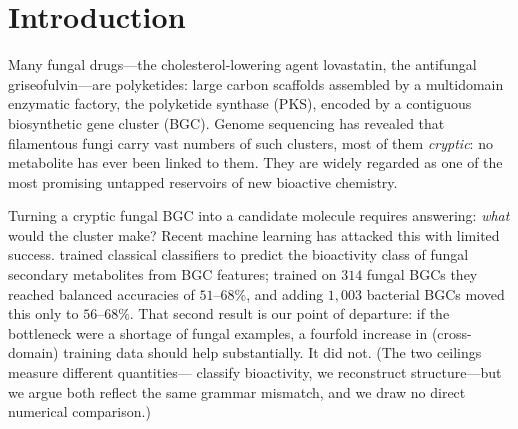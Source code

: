 \documentclass[11pt]{article}
\theoremstyle{definition}
\begin{document}
\begin{abstract}
Prediction and design are one quantity read twice---an \emph{identifiability--controllability
duality} (Theorem~\ref{thm:duality}, \S\ref{sec:duality}): the verifier's consistent set and the
designer's specification space are a single observability $\kappa_O$, so one engine serves both, and
the result travels, with a falsifiable prediction on RiPP biosynthesis. The stance is calibrated:
the iteration-grammar wall is \emph{established} on the prediction side (cross-taxa transfer, a
bacterial control) and \emph{pre-registered} on the design side (the product-neutral degeneracy it
predicts is, as yet, beyond coverage), and the design contribution rests on measured difficulty, not
on the cost model's form. Because structure elucidation in this field proceeds by heterologous
expression and NMR with mass spectrometry as triage---the route for all seven verified products we
curate from primary sources---the verdict doubles as a metabologenomics triage tool naming which
clusters triage settles. The observability and verdict layers are family-agnostic, demonstrated
unchanged over PKS, a non-ribosomal peptide (NRPS) grammar, and a typed PKS--NRPS hybrid; only the
program generator is family-specific. All tools, data, and analyses are open and reproducible from
single commands.
\end{abstract}

\section{Introduction}\label{sec:intro}

Many fungal drugs---the cholesterol-lowering agent lovastatin, the antifungal griseofulvin---are
polyketides: large carbon scaffolds assembled by a multidomain enzymatic factory, the polyketide
synthase (PKS), encoded by a contiguous biosynthetic gene cluster (BGC). Genome
sequencing has revealed that filamentous fungi carry vast numbers of such clusters, most of
them \emph{cryptic}: no metabolite has ever been linked to them. They are widely regarded as
one of the most promising untapped reservoirs of new bioactive chemistry.

Turning a cryptic fungal BGC into a candidate molecule requires answering: \emph{what} would
the cluster make? Recent machine learning has attacked this with limited success.
\citet{riedling2024} trained classical classifiers to predict the bioactivity class of fungal
secondary metabolites from BGC features; trained on $314$ fungal BGCs they reached balanced
accuracies of $51$--$68\%$, and adding $1{,}003$ bacterial BGCs moved this only to
$56$--$68\%$. That second result is our point of departure: if the bottleneck were a shortage
of fungal examples, a fourfold increase in (cross-domain) training data should help
substantially. It did not. (The two ceilings measure different quantities---\citet{riedling2024}
classify bioactivity, we reconstruct structure---but we argue both reflect the same grammar
mismatch, and we draw no direct numerical comparison.)
\end{document}
